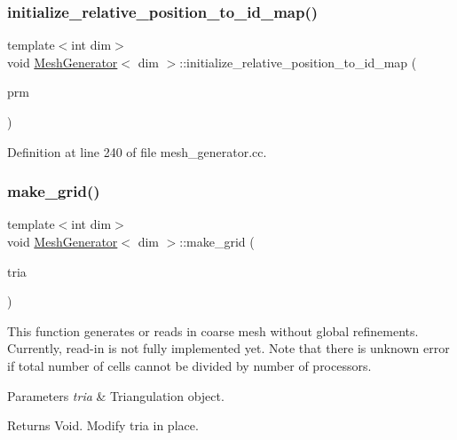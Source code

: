 \subsubsection{\texorpdfstring{initialize\+\_\+relative\+\_\+position\+\_\+to\+\_\+id\+\_\+map()}{initialize\_relative\_position\_to\_id\_map()}}
{\footnotesize\ttfamily template$<$int dim$>$ \\
void \hyperlink{class_mesh_generator}{Mesh\+Generator}$<$ dim $>$\+::initialize\+\_\+relative\+\_\+position\+\_\+to\+\_\+id\+\_\+map (\begin{DoxyParamCaption}\item[{Parameter\+Handler \&}]{prm }\end{DoxyParamCaption})\hspace{0.3cm}{\ttfamily [private]}}



Definition at line 240 of file mesh\+\_\+generator.\+cc.

\mbox{\label{class_mesh_generator_a27c6ff0b0c51700373ef9a1dc10abaaf}} 
\subsubsection{\texorpdfstring{make\+\_\+grid()}{make\_grid()}}
{\footnotesize\ttfamily template$<$int dim$>$ \\
void \hyperlink{class_mesh_generator}{Mesh\+Generator}$<$ dim $>$\+::make\+\_\+grid (\begin{DoxyParamCaption}\item[{parallel\+::distributed\+::\+Triangulation$<$ dim $>$ \&}]{tria }\end{DoxyParamCaption})}

This function generates or reads in coarse mesh without global refinements. Currently, read-\/in is not fully implemented yet. Note that there is unknown error if total number of cells cannot be divided by number of processors.


\begin{DoxyParams}{Parameters}
{\em tria} & Triangulation object. \\
\hline
\end{DoxyParams}
\begin{DoxyReturn}{Returns}
Void. Modify tria in place. 
\end{DoxyReturn}


